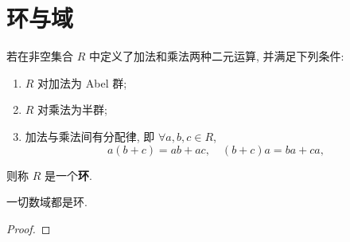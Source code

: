 \documentclass[../../main.tex]{subfiles}
\begin{document}
\section{环与域}

\begin{definition}[环]
若在非空集合 \( R \) 中定义了加法和乘法两种二元运算, 并满足下列条件:
\begin{enumerate}[(1)]
\item \( R \) 对加法为 Abel 群;
\item \( R \) 对乘法为半群;
\item 加法与乘法间有分配律, 即 \( \forall a,b,c \in R \),
\[
a(b + c) = ab + ac, \quad (b + c)a = ba + ca,
\]
\end{enumerate}
则称 \( R \) 是一个\textbf{环}.
\end{definition}

\begin{proposition}
一切数域都是环.
\end{proposition}
\begin{proof}

\end{proof}
\end{document}
